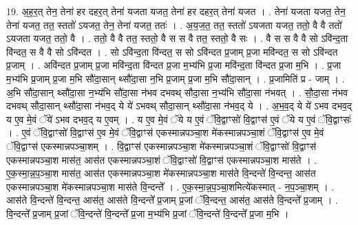 \documentclass[17pt]{extarticle}
\begin{document}
19. अ॒ह॒र॒त् तेन॒ तेना॑ हर दहर॒त् तेना॑ यजता यजत॒ तेना॑ हर दहर॒त् तेना॑ यजत । . तेना॑ यजता यजत॒ तेन॒ तेना॑ यजत॒ तत॒ स्ततो॑ ऽयजत॒ तेन॒ तेना॑ यजत॒ ततः॑ । . अ॒य॒ज॒त॒ तत॒ स्ततो॑ ऽयजता यजत॒ ततो॒ वै वै ततो॑ ऽयजता यजत॒ ततो॒ वै । . ततो॒ वै वै तत॒ स्ततो॒ वै स स वै तत॒ स्ततो॒ वै सः । . वै स स वै वै सो ऽवि॑न्द॒ता वि॑न्दत॒ स वै वै सो ऽवि॑न्दत । . सो ऽवि॑न्द॒ता वि॑न्दत॒ स सो ऽवि॑न्दत प्र॒जाम् प्र॒जा मवि॑न्दत॒ स सो ऽवि॑न्दत प्र॒जाम् । . अवि॑न्दत प्र॒जाम् प्र॒जा मवि॑न्द॒ता वि॑न्दत प्र॒जा म॒भ्य॑भि प्र॒जा मवि॑न्द॒ता वि॑न्दत प्र॒जा म॒भि । . प्र॒जा म॒भ्य॑भि प्र॒जाम् प्र॒जा म॒भि सौ॑दा॒सान् थ्सौ॑दा॒सा न॒भि प्र॒जाम् प्र॒जा म॒भि सौ॑दा॒सान् । . प्र॒जामिति॑ प्र - जाम् । . अ॒भि सौ॑दा॒सान् थ्सौ॑दा॒सा न॒भ्य॑भि सौ॑दा॒सा न॑भव दभवथ् सौदा॒सा न॒भ्य॑भि सौ॑दा॒सा न॑भवत् । . सौ॒दा॒सा न॑भव दभवथ् सौदा॒सान् थ्सौ॑दा॒सा न॑भव॒द् ये ये॑ ऽभवथ् सौदा॒सान् थ्सौ॑दा॒सा न॑भव॒द् ये । . अ॒भ॒व॒द् ये ये॑ ऽभव दभव॒द् य ए॒व मे॒वं ॅये॑ ऽभव दभव॒द् य ए॒वम् । . य ए॒व मे॒वं ॅये य ए॒वं ॅवि॒द्वाꣳसो॑ वि॒द्वाꣳस॑ ए॒वं ॅये य ए॒वं ॅवि॒द्वाꣳसः॑ । . ए॒वं ॅवि॒द्वाꣳसो॑ वि॒द्वाꣳस॑ ए॒व मे॒वं ॅवि॒द्वाꣳस॑ एकस्मान्नपञ्चा॒श मे॑कस्मान्नपञ्चा॒शं ॅवि॒द्वाꣳस॑ ए॒व मे॒वं ॅवि॒द्वाꣳस॑ एकस्मान्नपञ्चा॒शम् । . वि॒द्वाꣳस॑ एकस्मान्नपञ्चा॒श मे॑कस्मान्नपञ्चा॒शं ॅवि॒द्वाꣳसो॑ वि॒द्वाꣳस॑ एकस्मान्नपञ्चा॒श मास॑त॒ आस॑त एकस्मान्नपञ्चा॒शं ॅवि॒द्वाꣳसो॑ वि॒द्वाꣳस॑ एकस्मान्नपञ्चा॒श मास॑ते । . ए॒क॒स्मा॒न्न॒प॒ञ्चा॒श मास॑त॒ आस॑त एकस्मान्नपञ्चा॒श मे॑कस्मान्नपञ्चा॒श मास॑ते वि॒न्दन्ते॑ वि॒न्दन्त॒ आस॑त एकस्मान्नपञ्चा॒श मे॑कस्मान्नपञ्चा॒श मास॑ते वि॒न्दन्ते᳚ । . ए॒क॒स्मा॒न्न॒प॒ञ्चा॒शमित्ये॑कस्मात् - न॒प॒ञ्चा॒शम् । . आस॑ते वि॒न्दन्ते॑ वि॒न्दन्त॒ आस॑त॒ आस॑ते वि॒न्दन्ते᳚ प्र॒जाम् प्र॒जां ॅवि॒न्दन्त॒ आस॑त॒ आस॑ते वि॒न्दन्ते᳚ प्र॒जाम् । . वि॒न्दन्ते᳚ प्र॒जाम् प्र॒जां ॅवि॒न्दन्ते॑ वि॒न्दन्ते᳚ प्र॒जा म॒भ्य॑भि प्र॒जां ॅवि॒न्दन्ते॑ वि॒न्दन्ते᳚ प्र॒जा म॒भि । \newline
\end{document}

